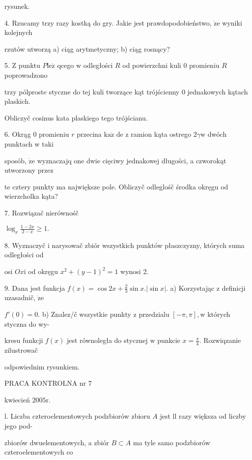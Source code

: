 \documentclass[a4paper,12pt]{article}
\begin{document}
rysunek.

4. Rzucamy trzy razy kostką do gry. Jakie jest prawdopodobieństwo, $\dot{\mathrm{z}}\mathrm{e}$ wyniki kolejnych

rzutów utworzą a) ciąg arytmetyczny; b) ciąg rosnący?

5. $\mathrm{Z}$ punktu $P \mathrm{l}\mathrm{e}\dot{\mathrm{z}}$ qcego $\mathrm{w}$ odległości $R$ od powierzchni kuli $0$ promieniu $R$ poprowadzono

trzy pólproste styczne do tej kuli tworzące kąt trójścienny $0$ jednakowych kątach plaskich.

Obliczyč cosinus kata plaskiego tego trójścianu.

6. Okrąg $0$ promieniu $r$ przecina $\mathrm{k}\mathrm{a}\dot{\mathrm{z}}$ de $\mathrm{z}$ ramion kąta ostrego $2\gamma \mathrm{w}$ dwóch punktach $\mathrm{w}$ taki

sposób, $\dot{\mathrm{z}}\mathrm{e}$ wyznaczajq one dwie cięciwy jednakowej długości, a czworokąt utworzony przez

te cztery punkty ma największe pole. Obliczyč odleglośč środka okręgu od wierzcholka kąta?

7. Rozwiązač nierównośč

$\displaystyle \log_{x}\frac{1-2x}{2-x}\geq 1.$

8. Wyznaczyč $\mathrm{i}$ narysowač zbiór wszystkich punktów płaszczyzny, których suma odległości od

osi $Ox\mathrm{i}$ od okręgu $x^{2}+(y-1)^{2}=1$ wynosi 2.

9. Dana jest funkcja $f(x) =\displaystyle \cos 2x+\frac{2}{3}\sin x. |\sin x|$. a) Korzystając $\mathrm{z}$ definicji uzasadnič, $\dot{\mathrm{z}}\mathrm{e}$

$f'(0) = 0$. b) Znalez/č wszystkie punkty $\mathrm{z}$ przedzialu $[-\pi,\pi], \mathrm{w}$ których styczna do wy-

kresu funkcji $f(x)$ jest równoległa do stycznej $\mathrm{w}$ punkcie $x = \displaystyle \frac{\pi}{4}$. Rozwiqzanie zilustrowač

odpowiednim rysunkiem.





PRACA KONTROLNA nr 7

kwiecień $2005\mathrm{r}.$

l. Liczba czteroelementowych podzbiorów zbioru $A$ jest ll razy większa od liczby jego pod-

zbiorów dwuelementowych, a zbiór $B\subset A$ ma tyle samo podzbiorów czteroelementowych co
\end{document}

